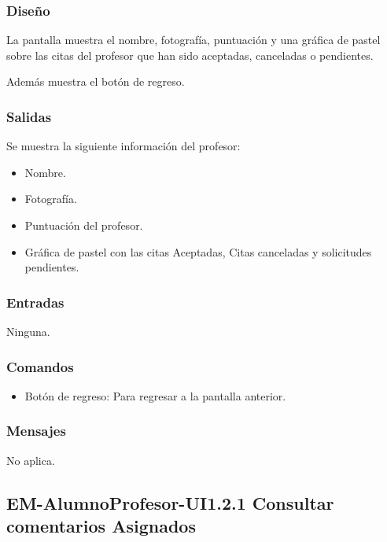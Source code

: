 \subsubsection{Diseño}
	\noindent
	La pantalla muestra el nombre, fotografía, puntuación y una gráfica de pastel sobre las citas del profesor que han sido aceptadas, canceladas o pendientes.
	
	Además muestra el botón de regreso.



\subsubsection{Salidas}
	Se muestra la siguiente información del profesor:
	\begin{itemize} 
		\item Nombre.
		\item Fotografía.
		\item Puntuación del profesor.
		\item Gráfica de pastel con las citas Aceptadas, Citas canceladas y solicitudes pendientes.
	\end{itemize}

\subsubsection{Entradas}
	\noindent
	Ninguna.

\subsubsection{Comandos}
\begin{itemize}
	\item Botón de regreso: Para regresar a la pantalla anterior.
	
\end{itemize}

\subsubsection{Mensajes}
	\noindent
	No aplica.
\subsection{EM-AlumnoProfesor-UI1.2.1 Consultar comentarios Asignados}

